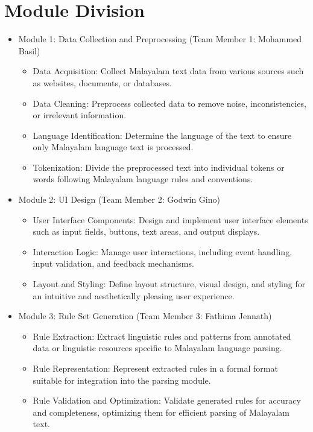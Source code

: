 \documentclass[12pt,a4paper,titlepage]{report}
\begin{document}
	\section{Module Division}
	\begin{itemize}
	\item Module 1: Data Collection and Preprocessing (Team Member 1: Mohammed Basil)
	\begin{itemize}
	\item Data Acquisition: Collect Malayalam text data from various sources such as websites, documents, or databases.
	\item Data Cleaning: Preprocess collected data to remove noise, inconsistencies, or irrelevant information.
	\item Language Identification: Determine the language of the text to ensure only Malayalam language text is processed.
	\item Tokenization: Divide the preprocessed text into individual tokens or words following Malayalam language rules and conventions.
\end{itemize}
	\item Module 2: UI Design (Team Member 2: Godwin Gino)
	\begin{itemize}
	\item User Interface Components: Design and implement user interface elements such as input fields, buttons, text areas, and output displays.
	\item Interaction Logic: Manage user interactions, including event handling, input validation, and feedback mechanisms.
	\item Layout and Styling: Define layout structure, visual design, and styling for an intuitive and aesthetically pleasing user experience.
\end{itemize}
	\item Module 3: Rule Set Generation (Team Member 3: Fathima Jennath)
	\begin{itemize}
	\item Rule Extraction: Extract linguistic rules and patterns from annotated data or linguistic resources specific to Malayalam language parsing.
	\item Rule Representation: Represent extracted rules in a formal format suitable for integration into the parsing module.
	\item Rule Validation and Optimization: Validate generated rules for accuracy and completeness, optimizing them for efficient parsing of Malayalam text.
\end{itemize}

\end{itemize}
\end{document}
